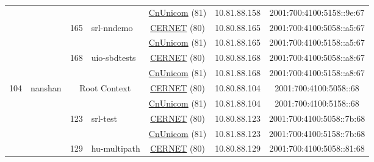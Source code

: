 \begin{small}
\begin{center}
\begin{longtable}{|c|c|c|c|c|c|c|c|}
  &  &  &  & \multicolumn{2}{|c|}{\tiny{\href{http://www.chinaunicom.com}{CnUnicom} (81)}} & \tiny{10.81.88.158} & \tiny{2001:700:4100:5158::9e:67} \\* \cline{3-3}\cline{4-4}\cline{5-5}\cline{6-6}\cline{7-7}\cline{8-8}
  &  & \multirow{2}{*}{\tiny{165}} & \multicolumn{1}{|l|}{\multirow{2}{*}{\tiny{srl-nndemo}}} & \multicolumn{2}{|c|}{\tiny{\href{http://www.cernet.edu.cn}{CERNET} (80)}} & \tiny{10.80.88.165} & \tiny{2001:700:4100:5058::a5:67} \\* \cline{5-5}\cline{6-6}\cline{7-7}\cline{8-8}
  &  &  &  & \multicolumn{2}{|c|}{\tiny{\href{http://www.chinaunicom.com}{CnUnicom} (81)}} & \tiny{10.81.88.165} & \tiny{2001:700:4100:5158::a5:67} \\* \cline{3-3}\cline{4-4}\cline{5-5}\cline{6-6}\cline{7-7}\cline{8-8}
  &  & \multirow{2}{*}{\tiny{168}} & \multicolumn{1}{|l|}{\multirow{2}{*}{\tiny{uio-sbdtests}}} & \multicolumn{2}{|c|}{\tiny{\href{http://www.cernet.edu.cn}{CERNET} (80)}} & \tiny{10.80.88.168} & \tiny{2001:700:4100:5058::a8:67} \\* \cline{5-5}\cline{6-6}\cline{7-7}\cline{8-8}
  &  &  &  & \multicolumn{2}{|c|}{\tiny{\href{http://www.chinaunicom.com}{CnUnicom} (81)}} & \tiny{10.81.88.168} & \tiny{2001:700:4100:5158::a8:67} \\ \hline
 \multirow{24}{*}{\tiny{104}} & \multicolumn{1}{|l|}{\multirow{24}{*}{\tiny{nanshan}}} & \multicolumn{2}{|c|}{\multirow{2}{*}{\tiny{Root Context}}} & \multicolumn{2}{|c|}{\tiny{\href{http://www.cernet.edu.cn}{CERNET} (80)}} & \tiny{10.80.88.104} & \tiny{2001:700:4100:5058::68} \\* \cline{5-5}\cline{6-6}\cline{7-7}\cline{8-8}
  &  & \multicolumn{2}{|c|}{} & \multicolumn{2}{|c|}{\tiny{\href{http://www.chinaunicom.com}{CnUnicom} (81)}} & \tiny{10.81.88.104} & \tiny{2001:700:4100:5158::68} \\* \cline{3-3}\cline{4-4}\cline{5-5}\cline{6-6}\cline{7-7}\cline{8-8}
  &  & \multirow{2}{*}{\tiny{123}} & \multicolumn{1}{|l|}{\multirow{2}{*}{\tiny{srl-test}}} & \multicolumn{2}{|c|}{\tiny{\href{http://www.cernet.edu.cn}{CERNET} (80)}} & \tiny{10.80.88.123} & \tiny{2001:700:4100:5058::7b:68} \\* \cline{5-5}\cline{6-6}\cline{7-7}\cline{8-8}
  &  &  &  & \multicolumn{2}{|c|}{\tiny{\href{http://www.chinaunicom.com}{CnUnicom} (81)}} & \tiny{10.81.88.123} & \tiny{2001:700:4100:5158::7b:68} \\* \cline{3-3}\cline{4-4}\cline{5-5}\cline{6-6}\cline{7-7}\cline{8-8}
  &  & \multirow{2}{*}{\tiny{129}} & \multicolumn{1}{|l|}{\multirow{2}{*}{\tiny{hu-multipath}}} & \multicolumn{2}{|c|}{\tiny{\href{http://www.cernet.edu.cn}{CERNET} (80)}} & \tiny{10.80.88.129} & \tiny{2001:700:4100:5058::81:68} \\* \cline{5-5}\cline{6-6}\cline{7-7}\cline{8-8}

\end{longtable}
\end{center}
\end{small}
